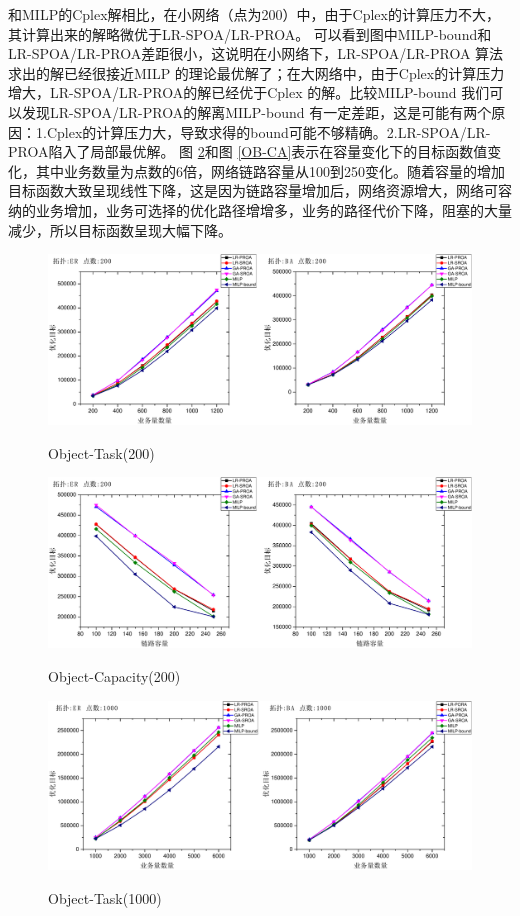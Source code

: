 和MILP的Cplex解相比，在小网络（点为200）中，由于Cplex的计算压力不大，其计算出来的解略微优于LR-SPOA/LR-PROA。
可以看到图中MILP-bound和LR-SPOA/LR-PROA差距很小，这说明在小网络下，LR-SPOA/LR-PROA 算法求出的解已经很接近MILP 的理论最优解了；在大网络中，由于Cplex的计算压力增大，LR-SPOA/LR-PROA的解已经优于Cplex 的解。比较MILP-bound 我们可以发现LR-SPOA/LR-PROA的解离MILP-bound 有一定差距，这是可能有两个原因：1.Cplex的计算压力大，导致求得的bound可能不够精确。2.LR-SPOA/LR-PROA陷入了局部最优解。
图 \ref{OB-CA-200}和图 \ref{OB-CA}表示在容量变化下的目标函数值变化，其中业务数量为点数的6倍，网络链路容量从100到250变化。随着容量的增加目标函数大致呈现线性下降，这是因为链路容量增加后，网络资源增大，网络可容纳的业务增加，业务可选择的优化路径增增多，业务的路径代价下降，阻塞的大量减少，所以目标函数呈现大幅下降。
\begin{figure}
\setlength{\belowcaptionskip}{-0.1cm}
\begin{center}
{\includegraphics[width=0.8 \textwidth]{figures/OB-TA-200.pdf}}
\end{center}
\caption{{\footnotesize{Object-Task(200)}}}
\label{OB-TA-200}
\end{figure}
\begin{figure}
\setlength{\belowcaptionskip}{-0.1cm}
\begin{center}
{\includegraphics[width=0.8 \textwidth]{figures/OB-CA-200.pdf}}
\end{center}
\caption{{\footnotesize{Object-Capacity(200)}}}
\label{OB-CA-200}
\end{figure}
\begin{figure}
\setlength{\belowcaptionskip}{-0.1cm}
\begin{center}
{\includegraphics[width=0.8 \textwidth]{figures/OB-TA.pdf}}
\end{center}
\caption{{\footnotesize{Object-Task(1000)}}}
\label{OB-TA}
\end{figure}

